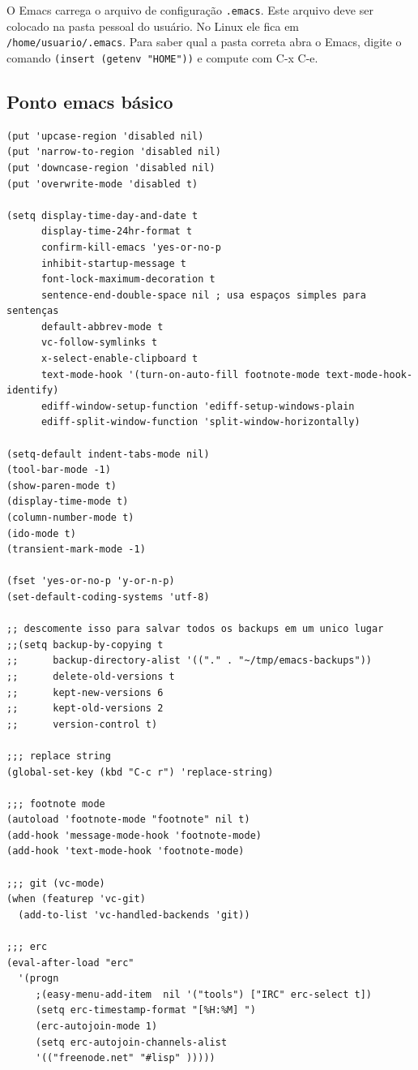 \documentclass[12pt,brazil]{book}
\begin{document}
O Emacs carrega o arquivo de configuração \verb!.emacs!. Este arquivo
deve ser colocado na pasta pessoal do usuário. No Linux ele fica em
\verb!/home/usuario/.emacs!. Para saber qual a pasta correta abra o
Emacs, digite o comando \verb!(insert (getenv "HOME"))! e compute com
C-x C-e.

\subsection{Ponto emacs básico}
\label{sec:dot-emacs-basico}

\begin{verbatim}
(put 'upcase-region 'disabled nil)
(put 'narrow-to-region 'disabled nil)
(put 'downcase-region 'disabled nil)
(put 'overwrite-mode 'disabled t)

(setq display-time-day-and-date t
      display-time-24hr-format t
      confirm-kill-emacs 'yes-or-no-p
      inhibit-startup-message t
      font-lock-maximum-decoration t
      sentence-end-double-space nil ; usa espaços simples para sentenças
      default-abbrev-mode t
      vc-follow-symlinks t
      x-select-enable-clipboard t
      text-mode-hook '(turn-on-auto-fill footnote-mode text-mode-hook-identify)
      ediff-window-setup-function 'ediff-setup-windows-plain
      ediff-split-window-function 'split-window-horizontally)

(setq-default indent-tabs-mode nil)
(tool-bar-mode -1)
(show-paren-mode t)
(display-time-mode t)
(column-number-mode t)
(ido-mode t)
(transient-mark-mode -1)

(fset 'yes-or-no-p 'y-or-n-p) 
(set-default-coding-systems 'utf-8)

;; descomente isso para salvar todos os backups em um unico lugar
;;(setq backup-by-copying t
;;      backup-directory-alist '(("." . "~/tmp/emacs-backups"))
;;      delete-old-versions t
;;      kept-new-versions 6
;;      kept-old-versions 2
;;      version-control t)

;;; replace string
(global-set-key (kbd "C-c r") 'replace-string)

;;; footnote mode
(autoload 'footnote-mode "footnote" nil t)
(add-hook 'message-mode-hook 'footnote-mode)
(add-hook 'text-mode-hook 'footnote-mode)

;;; git (vc-mode)
(when (featurep 'vc-git)
  (add-to-list 'vc-handled-backends 'git))

;;; erc
(eval-after-load "erc"
  '(progn
     ;(easy-menu-add-item  nil '("tools") ["IRC" erc-select t])
     (setq erc-timestamp-format "[%H:%M] ")
     (erc-autojoin-mode 1)
     (setq erc-autojoin-channels-alist
     '(("freenode.net" "#lisp" )))))


\end{verbatim}
\end{document}
